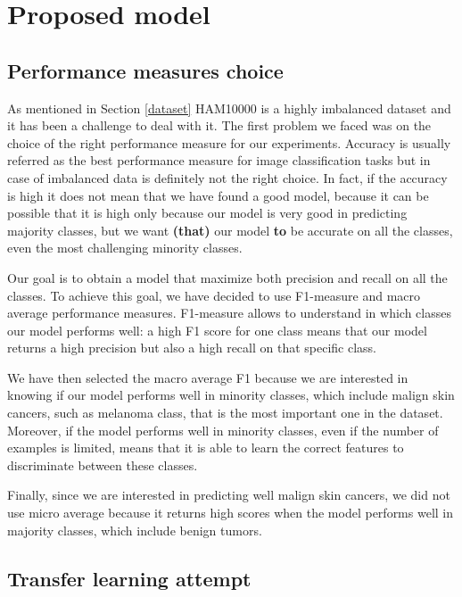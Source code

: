 \section{Proposed model} \label{proposed_model}

	\subsection{Performance measures choice}
		
		As mentioned in Section \ref{dataset} HAM10000 is a highly imbalanced dataset and it has been a challenge to deal with it. The first problem we faced was on the choice of the right performance measure for our experiments. Accuracy is usually referred as the best performance measure for image classification tasks but in case of imbalanced data is definitely not the right choice. In fact, if the accuracy is high it does not mean that we have found a good model, because it can be possible that it is high only because our model is very good in predicting majority classes, but we want \textbf{(that)} our model \textbf{to} be accurate on all the classes, even the most challenging minority classes.
		
		\smallskip
		
		Our goal is to obtain a model that maximize both precision and recall on all the classes.
		To achieve this goal, we have decided to use F1-measure and macro average performance measures. F1-measure allows to understand in which classes our model performs well: a high F1 score for one class means that our model returns a high precision but also a high recall on that specific class. 
		
		\smallskip
		
		We have then selected the macro average F1 because we are interested in knowing if our model performs well in minority classes, which include malign skin cancers, such as melanoma class, that is the most important one in the dataset. 
		Moreover, if the model performs well in minority classes, even if the number of examples is limited, means that it is able to learn the correct features to discriminate between these classes. 
		
		\smallskip
		
		Finally, since we are interested in predicting well malign skin cancers, we did not use micro average because it returns high scores when the model performs well in majority classes, which include benign tumors.
		
	\subsection{Transfer learning attempt}
		
